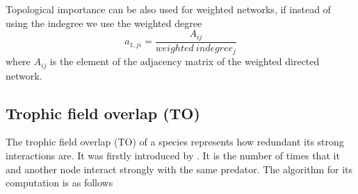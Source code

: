 \documentclass[twocolumn]{article}
\begin{document}
        \par Topological importance can be also used for weighted networks, if instead of using the indegree we use the weighted degree \citep{Scotti2007}
        \begin{equation}
            a_{1,ji}=\frac{A_{ij}}{weighted\:indegree_j}
        \end{equation}
        where $A_{ij}$ is the element of the adjacency matrix of the weighted directed network. 
    \subsection*{Trophic field overlap (TO)}
        The trophic field overlap (TO) of a species represents how redundant its strong interactions are. It was firstly introduced by \citet{Jordan2009a}. It is the number of times that it and another node interact strongly with the same predator. The algorithm for its computation is as follows \citep{Jordan2018}
\end{document}
